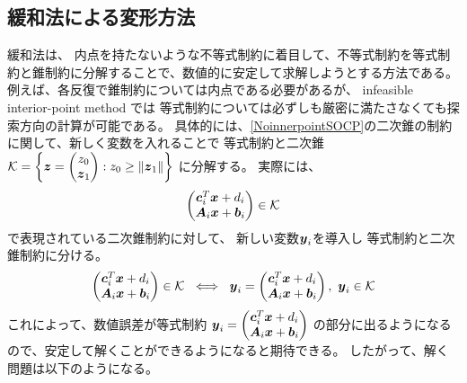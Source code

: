 \documentclass[11pt,a4paper,dvipdfmx,titlepage,uplatex]{jsarticle}
\theoremstyle{mystyle}
\newcommand{\0}{\mathbf{0}}
\def\b{\mbox{\boldmath $b$}}
\def\c{\mbox{\boldmath $c$}}
\def\x{\mbox{\boldmath $x$}}
\def\y{\mbox{\boldmath $y$}}
\def\z{\mbox{\boldmath $z$}}
\def\A{\mbox{\boldmath $A$}}
\def\KC{\mbox{$\cal K$}}
\begin{document}
\subsection{緩和法による変形方法}\label{sec:Deformation_relax}
緩和法は、
内点を持たないような不等式制約に着目して、不等式制約を等式制約と錐制約に分解することで、数値的に安定して求解しようとする方法である。
例えば、各反復で錐制約については内点である必要があるが、
infeasible interior-point method では
等式制約については必ずしも厳密に満たさなくても探索方向の計算が可能である。
具体的には、\eqref{NoinnerpointSOCP}の二次錐の制約に関して、新しく変数を入れることで
等式制約と二次錐 $\KC = \left\{ \z = \begin{pmatrix}
z_0 \\ \z_1  \end{pmatrix}: z_0 \ge \|\z_1\| \right\}$ に分解する。
実際には、
\begin{align}
  \begin{pmatrix}
  \c_i^T \x + d_i \\  \A_i \x + \b_i
\end{pmatrix} \in \KC
\end{align}
で表現されている二次錐制約に対して、
新しい変数$\y_i$を導入し
等式制約と二次錐制約に分ける。
\begin{align}
	\begin{pmatrix}
		\c_i^T \x + d_i \\  \A_i \x + \b_i
	\end{pmatrix} \in \KC
\ \iff \
  \y_i = \begin{pmatrix}
  \c_i^T \x + d_i \\  \A_i \x + \b_i
\end{pmatrix}, \ \y_i \in \KC
\end{align}
これによって、数値誤差が等式制約
$\y_i = \begin{pmatrix}
\c_i^T \x + d_i \\  \A_i \x + \b_i
\end{pmatrix}$
の部分に出るようになるので、安定して解くことができるようになると期待できる。
したがって、解く問題は以下のようになる。
\end{document}
